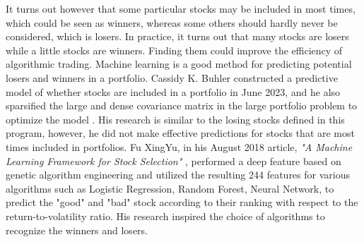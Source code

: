\documentclass[default,iicol]{sn-jnl}%
\begin{document}
It turns out however that some particular stocks may be included in most times, which could be seen as winners, whereas some others should hardly never be considered, which is losers. In practice, it turns out that many stocks are losers while a little stocks are winners. Finding them could improve the efficiency of algorithmic trading. Machine learning is a good method for predicting potential losers and winners in a portfolio. Cassidy K. Buhler constructed a predictive model of whether stocks are included in a portfolio in June 2023, and he also sparsified the large and dense covariance matrix in the large portfolio problem to optimize the model \cite{buhler2023efficient}. His research is similar to the losing stocks defined in this program, however, he did not make effective predictions for stocks that are most times included in portfolios. Fu XingYu, in his August 2018 article, \textit{"A Machine Learning Framework for Stock Selection"} \cite{fu2018machine}, performed a deep feature based on genetic algorithm engineering and utilized the resulting 244 features for various algorithms such as Logistic Regression, Random Forest, Neural Network, to predict the "good" and "bad" stock according to their ranking with respect to the return-to-volatility ratio. His research inspired the choice of algorithms to recognize the winners and losers.
\end{document}
